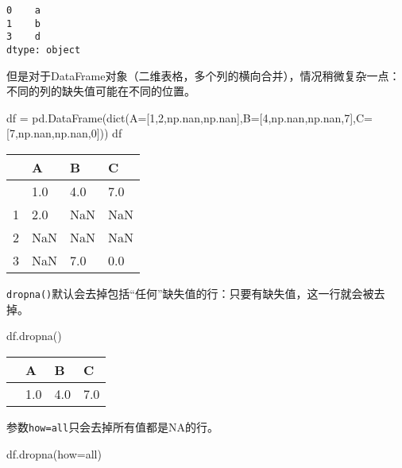 \documentclass[
  letterpaper,
  DIV=11,
  numbers=noendperiod]{scrreprt}
\newenvironment{Shaded}{\begin{snugshade}}{\end{snugshade}}
\newcommand{\BuiltInTok}[1]{\textcolor[rgb]{0.00,0.23,0.31}{#1}}
\newcommand{\DecValTok}[1]{\textcolor[rgb]{0.68,0.00,0.00}{#1}}
\newcommand{\NormalTok}[1]{\textcolor[rgb]{0.00,0.23,0.31}{#1}}
\newcommand{\OperatorTok}[1]{\textcolor[rgb]{0.37,0.37,0.37}{#1}}
\newcommand{\StringTok}[1]{\textcolor[rgb]{0.13,0.47,0.30}{#1}}
\begin{document}
\begin{verbatim}
0    a
1    b
3    d
dtype: object
\end{verbatim}

但是对于DataFrame对象（二维表格，多个列的横向合并），情况稍微复杂一点：不同的列的缺失值可能在不同的位置。

\begin{Shaded}
\begin{Highlighting}[]
\NormalTok{df }\OperatorTok{=}\NormalTok{ pd.DataFrame(}\BuiltInTok{dict}\NormalTok{(A}\OperatorTok{=}\NormalTok{[}\DecValTok{1}\NormalTok{,}\DecValTok{2}\NormalTok{,np.nan,np.nan],B}\OperatorTok{=}\NormalTok{[}\DecValTok{4}\NormalTok{,np.nan,np.nan,}\DecValTok{7}\NormalTok{],C}\OperatorTok{=}\NormalTok{[}\DecValTok{7}\NormalTok{,np.nan,np.nan,}\DecValTok{0}\NormalTok{]))}
\NormalTok{df}
\end{Highlighting}
\end{Shaded}

\begin{longtable}[]{@{}llll@{}}
\toprule\noalign{}
& A & B & C \\
\midrule\noalign{}
\endhead
\bottomrule\noalign{}
\endlastfoot
0 & 1.0 & 4.0 & 7.0 \\
1 & 2.0 & NaN & NaN \\
2 & NaN & NaN & NaN \\
3 & NaN & 7.0 & 0.0 \\
\end{longtable}

\texttt{dropna()}默认会去掉包括``任何''缺失值的行：只要有缺失值，这一行就会被去掉。

\begin{Shaded}
\begin{Highlighting}[]
\NormalTok{df.dropna()}
\end{Highlighting}
\end{Shaded}

\begin{longtable}[]{@{}llll@{}}
\toprule\noalign{}
& A & B & C \\
\midrule\noalign{}
\endhead
\bottomrule\noalign{}
\endlastfoot
0 & 1.0 & 4.0 & 7.0 \\
\end{longtable}

参数\texttt{how=\textquotesingle{}all\textquotesingle{}}只会去掉所有值都是NA的行。

\begin{Shaded}
\begin{Highlighting}[]
\NormalTok{df.dropna(how}\OperatorTok{=}\StringTok{\textquotesingle{}all\textquotesingle{}}\NormalTok{)}
\end{Highlighting}
\end{Shaded}
\end{document}

